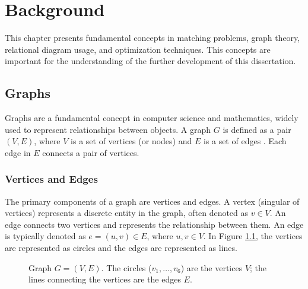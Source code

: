 
\chapter{Background} \label{chap:background}

    This chapter presents fundamental concepts in matching problems, graph theory, relational diagram usage, and optimization techniques. This concepts are important for the understanding of the further development of this dissertation.
    \section{Graphs}
    
        Graphs are a fundamental concept in computer science and mathematics, widely used to represent relationships between objects. A graph \( G \) is defined as a pair \( (V, E) \), where \( V \) is a set of vertices (or nodes) and \( E \) is a set of edges \cite{cormen}. Each edge in \( E \) connects a pair of vertices.

        \subsection{Vertices and Edges}
        
            The primary components of a graph are vertices and edges\cite{cormen, bondy1976graph}. A vertex (singular of vertices) represents a discrete entity in the graph, often denoted as \( v \in V \). An edge connects two vertices and represents the relationship between them. An edge is typically denoted as \( e = (u, v) \in E \), where \( u, v \in V \).
            In Figure \ref{fig:base_graph}, the vertices are represented as circles and the edges are represented as lines.

            
            \begin{figure}[!ht]
                \centering
                \caption{Graph $G = (V, E)$. The circles ($v_1, \ldots, v_6$) are the vertices $V$; the lines connecting the vertices are the edges $E$.} \label{fig:base_graph}
            \end{figure}
        
